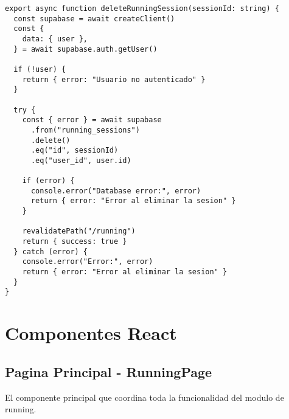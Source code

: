 \documentclass[12pt,a4paper]{article}
\begin{document}
\begin{lstlisting}[caption=Funcion deleteRunningSession completa]
export async function deleteRunningSession(sessionId: string) {
  const supabase = await createClient()
  const {
    data: { user },
  } = await supabase.auth.getUser()

  if (!user) {
    return { error: "Usuario no autenticado" }
  }

  try {
    const { error } = await supabase
      .from("running_sessions")
      .delete()
      .eq("id", sessionId)
      .eq("user_id", user.id)

    if (error) {
      console.error("Database error:", error)
      return { error: "Error al eliminar la sesion" }
    }

    revalidatePath("/running")
    return { success: true }
  } catch (error) {
    console.error("Error:", error)
    return { error: "Error al eliminar la sesion" }
  }
}
\end{lstlisting}

\section{Componentes React}

\subsection{Pagina Principal - RunningPage}

El componente principal que coordina toda la funcionalidad del modulo de running.
\end{document}
